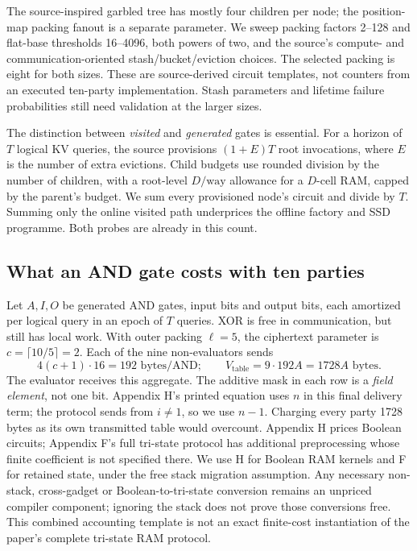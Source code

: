 The source-inspired garbled tree has mostly four children per node; the
position-map packing fanout is a separate parameter. We sweep packing factors
2--128 and flat-base thresholds 16--4096, both powers of two, and the source's
compute- and communication-oriented stash/bucket/eviction choices. The selected
packing is eight for both sizes. These are source-derived circuit templates,
not counters from an executed ten-party implementation. Stash parameters and
lifetime failure probabilities still need validation at the larger sizes.

The distinction between \emph{visited} and \emph{generated} gates is essential.
For a horizon of $T$ logical KV queries, the source provisions $(1+E)T$ root
invocations, where $E$ is the number of extra evictions. Child budgets use rounded
division by the number of children, with a root-level $D/\mathrm{way}$ allowance
for a $D$-cell RAM, capped by the parent's budget. We sum every provisioned
node's circuit and divide by $T$. Summing only the online visited path underprices
the offline factory and SSD programme. Both probes are already in this count.

\subsection{What an AND gate costs with ten parties}
Let $A,I,O$ be generated AND gates, input bits and output bits, each amortized
per logical query in an epoch of $T$ queries. XOR is free in
communication, but still has local work. With outer packing $\ell=5$, the
ciphertext parameter is $c=\lceil10/5\rceil=2$. Each of the nine non-evaluators
sends
\[
 4(c+1)\cdot16=192\text{ bytes/AND};\qquad
 V_{\mathrm{table}}=9\cdot192A=1728A\text{ bytes}.
\]
The evaluator receives this aggregate. The additive mask in each row is a
\emph{field element}, not one bit. Appendix H's printed equation uses $n$ in
this final delivery term; the protocol sends from $i\ne1$, so we use $n-1$.
Charging every party 1728 bytes as its own transmitted table would overcount.
Appendix H prices Boolean circuits; Appendix F's full tri-state protocol has
additional preprocessing whose finite coefficient is not specified there.
We use H for Boolean RAM kernels and F for retained state, under the free
stack migration assumption. Any necessary non-stack, cross-gadget or
Boolean-to-tri-state conversion remains an unpriced compiler component;
ignoring the stack does not prove those conversions free.
This combined accounting template is not
an exact finite-cost instantiation of the paper's complete tri-state RAM protocol.

